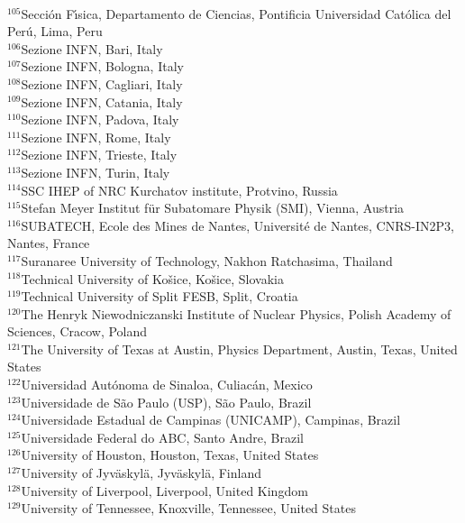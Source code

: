 \begin{flushleft}
\\
$^{105}$Secci\'{o}n F\'{\i}sica, Departamento de Ciencias, Pontificia Universidad Cat\'{o}lica del Per\'{u}, Lima, Peru
\\
$^{106}$Sezione INFN, Bari, Italy
\\
$^{107}$Sezione INFN, Bologna, Italy
\\
$^{108}$Sezione INFN, Cagliari, Italy
\\
$^{109}$Sezione INFN, Catania, Italy
\\
$^{110}$Sezione INFN, Padova, Italy
\\
$^{111}$Sezione INFN, Rome, Italy
\\
$^{112}$Sezione INFN, Trieste, Italy
\\
$^{113}$Sezione INFN, Turin, Italy
\\
$^{114}$SSC IHEP of NRC Kurchatov institute, Protvino, Russia
\\
$^{115}$Stefan Meyer Institut f\"{u}r Subatomare Physik (SMI), Vienna, Austria
\\
$^{116}$SUBATECH, Ecole des Mines de Nantes, Universit\'{e} de Nantes, CNRS-IN2P3, Nantes, France
\\
$^{117}$Suranaree University of Technology, Nakhon Ratchasima, Thailand
\\
$^{118}$Technical University of Ko\v{s}ice, Ko\v{s}ice, Slovakia
\\
$^{119}$Technical University of Split FESB, Split, Croatia
\\
$^{120}$The Henryk Niewodniczanski Institute of Nuclear Physics, Polish Academy of Sciences, Cracow, Poland
\\
$^{121}$The University of Texas at Austin, Physics Department, Austin, Texas, United States
\\
$^{122}$Universidad Aut\'{o}noma de Sinaloa, Culiac\'{a}n, Mexico
\\
$^{123}$Universidade de S\~{a}o Paulo (USP), S\~{a}o Paulo, Brazil
\\
$^{124}$Universidade Estadual de Campinas (UNICAMP), Campinas, Brazil
\\
$^{125}$Universidade Federal do ABC, Santo Andre, Brazil
\\
$^{126}$University of Houston, Houston, Texas, United States
\\
$^{127}$University of Jyv\"{a}skyl\"{a}, Jyv\"{a}skyl\"{a}, Finland
\\
$^{128}$University of Liverpool, Liverpool, United Kingdom
\\
$^{129}$University of Tennessee, Knoxville, Tennessee, United States

\end{flushleft}
